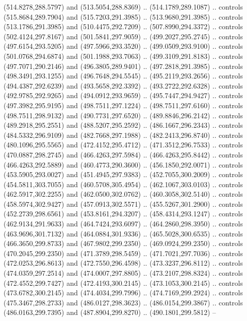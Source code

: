 \begin{scope}[cm={{1.25,0.0,0.0,-1.25,(0.0,743.43331)}}]
    (514.8278,288.5797) and (513.5054,288.8369) .. (514.1789,289.1087) .. controls
    (515.8684,289.7904) and (515.7203,291.3985) .. (513.9680,291.3985) .. controls
    (513.1786,291.3985) and (510.4475,292.7209) .. (507.8990,294.3372) .. controls
    (502.4124,297.8167) and (501.5841,297.9059) .. (499.2027,295.2745) .. controls
    (497.6154,293.5205) and (497.5966,293.3520) .. (499.0509,293.9100) .. controls
    (501.0768,294.6874) and (501.1988,293.7063) .. (499.3109,291.8183) .. controls
    (497.7071,290.2146) and (496.3805,289.9401) .. (497.2818,291.3985) .. controls
    (498.3491,293.1255) and (496.7648,294.5545) .. (495.2119,293.2656) .. controls
    (494.4387,292.6239) and (493.5658,292.3392) .. (493.2722,292.6328) .. controls
    (492.9785,292.9265) and (494.0912,293.9659) .. (495.7447,294.9427) .. controls
    (497.3982,295.9195) and (498.7511,297.1224) .. (498.7511,297.6160) .. controls
    (498.7511,298.9132) and (490.7731,297.6520) .. (489.8846,296.2142) .. controls
    (489.2918,295.2551) and (488.5207,295.2592) .. (486.1667,296.2343) .. controls
    (484.5332,296.9109) and (482.7668,297.1988) .. (482.2413,296.8740) .. controls
    (480.1096,295.5565) and (472.4152,295.4712) .. (471.3512,296.7533) .. controls
    (470.0887,298.2745) and (466.4263,297.5984) .. (466.4263,295.8442) .. controls
    (466.4263,292.5889) and (460.4773,290.3600) .. (456.1850,292.0071) .. controls
    (453.5905,293.0027) and (451.4945,297.9383) .. (452.7055,300.2009) .. controls
    (454.5811,303.7055) and (460.5708,305.4954) .. (462.1067,303.0103) .. controls
    (462.5917,302.2255) and (462.0500,302.0762) .. (460.3058,302.5140) .. controls
    (458.5974,302.9427) and (457.0913,302.5571) .. (455.5267,301.2900) .. controls
    (452.2739,298.6561) and (453.8161,294.3207) .. (458.4314,293.1247) .. controls
    (462.9134,291.9633) and (464.7424,293.6097) .. (464.2860,298.3950) .. controls
    (463.9696,301.7132) and (464.0884,301.9336) .. (465.5028,300.6535) .. controls
    (466.3650,299.8733) and (467.9802,299.2350) .. (469.0924,299.2350) .. controls
    (470.2045,299.2350) and (471.3789,298.5459) .. (471.7021,297.7036) .. controls
    (472.0253,296.8613) and (472.7550,296.4598) .. (473.3237,296.8112) .. controls
    (474.0359,297.2514) and (474.0007,297.8805) .. (473.2107,298.8324) .. controls
    (472.4552,299.7427) and (472.4193,300.2145) .. (473.1053,300.2145) .. controls
    (473.6782,300.2145) and (474.4034,299.7996) .. (474.7169,299.2924) .. controls
    (475.3467,298.2733) and (486.0127,298.3623) .. (486.0154,299.3867) .. controls
    (486.0163,299.7395) and (487.8904,299.8270) .. (490.1801,299.5812) --

\end{scope}
